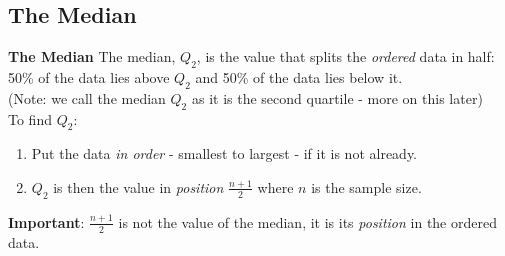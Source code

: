 \documentclass[compress]{beamer}        %
\makeatletter
\newcommand{\tcb}{\textcolor{beamer@blendedblue}}
\makeatother
\begin{document}
\subsection{The Median}
\begin{frame}{\bf \tcb{The Median}}
The median, $Q_2$, is the value that splits the \emph{ordered} data in half:\\
50\% of the data lies above $Q_2$ and 50\% of the data lies below it.\\
{\footnotesize(Note: we call the median $Q_2$ as it is the second quartile - more on this later)}\\[0.6cm]

To find $Q_2$:\\[0.2cm]
\begin{enumerate}[1.]\itemsep0.4cm
\item Put the data \emph{in order} - smallest to largest - if it is not already.
\item $Q_2$ is then the value in \emph{position} $\boxed{\frac{n+1}{2}}$ where $n$ is the sample size.\\[0.6cm]
\end{enumerate}

{\bf Important}: $\tfrac{n+1}{2}$ is not the value of the median, it is its \emph{position} in the\newline{} ordered data.

\end{frame}
\end{document}
